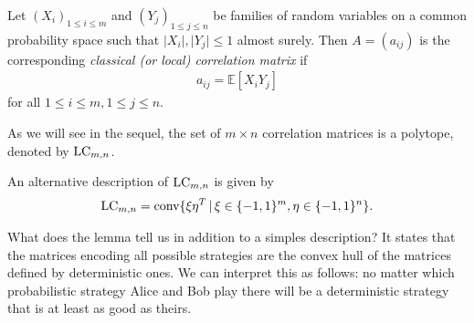 \begin{dfn}
	Let $ (X_i)_{1 \le i \le m } $ and $ (Y_j)_{1 \le j \le n} $ be families of random variables on a common probability space such that $ \vert X_i \vert, \vert Y_j \vert \le 1 $ almost surely. Then $ A=(a_{ij}) $ is the corresponding {\itshape classical (or local) correlation matrix} if 
	\begin{align*}
		a_{ij} = \mathbb{E}[X_iY_j]
	\end{align*}
	for all $ 1 \le i \le m, 1 \le j \le n $.
\end{dfn}
As we will see in the sequel, the set of $ m \times n $ correlation matrices is a polytope, denoted by $ \textup{LC}_{m,n} $.
\begin{lemma}\label{LemLC}
	An alternative description of $ \textup{LC}_{m,n} $ is given by 
	\begin{align}\label{EqLC}
		\textup{LC}_{m,n} = \textup{conv} \{  \xi\eta^T \, | \, \xi \in \{-1,1\}^m, \eta \in \{-1,1\}^n     \}.
	\end{align}
\end{lemma}
What does the lemma tell us in addition to a simples description? It states that the matrices encoding all possible strategies are the convex hull of the matrices defined by deterministic ones. We can interpret this as follows: no matter which probabilistic strategy Alice and Bob play there will be a deterministic strategy that is at least as good as theirs. 
